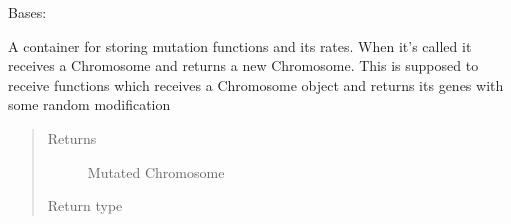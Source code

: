 \documentclass[letterpaper,10pt,english]{sphinxmanual}
\begin{document}

\begin{fulllineitems}
\label{\detokenize{MolOpt.genetic:MolOpt.genetic.genetic.Mutate}}
\sphinxAtStartPar
Bases: 

\sphinxAtStartPar
A container for storing mutation functions and its rates. When it’s called it receives a Chromosome and returns
a new Chromosome. This is supposed to receive functions which receives a Chromosome object and returns its genes 
with some random modification
\begin{quote}\begin{description}
\item[{Returns}] \leavevmode
\sphinxAtStartPar
Mutated Chromosome

\item[{Return type}] \leavevmode
\sphinxAtStartPar
{\hyperref[\detokenize{MolOpt.genetic:MolOpt.genetic.genetic.Chromosome}]{}}

\end{description}\end{quote}

\end{fulllineitems}

\end{document}
